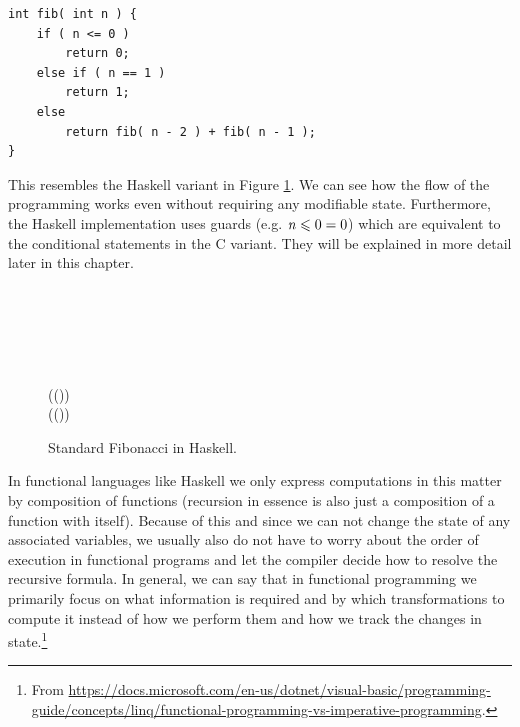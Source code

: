 \documentclass[paper=A4,twoside=true,openright,parskip=full,chapterprefix=true,headings=normal,bibliography=totoc,listof=totoc,titlepage=on,captions=tableabove,draft=false,british]{scrreprt}%
\begin{document}
\begin{center}
\lstset{language=C}
\centering
\begin{lstlisting}
int fib( int n ) {
    if ( n <= 0 )
        return 0;
    else if ( n == 1 )
        return 1;
    else
        return fib( n - 2 ) + fib( n - 1 );
}
\end{lstlisting}
\end{center}
\vspace{-1\baselineskip}

This resembles the Haskell variant in Figure \ref{fig:fibonacciHaskell}.
We can see how the flow of the programming works even without requiring
any modifiable state. Furthermore, the Haskell implementation uses
guards (e.g. \ensuremath{\Varid{n}\leq \mathrm{0}\mathrel{=}\mathrm{0}}) which are equivalent to the conditional
statements in the C variant. They will be explained in more detail later
in this chapter.

\begin{figure}[h]
\centering
\begin{hscode}\SaveRestoreHook
{}%
%
%
%
%
\>[B]{}\mathbin{::}\to {}\<[E]%
\\
\>[B]{}\;\<[E]%
\\
\>[B]{}\<[5]%
\>[5]{}\mid {}\leq {}\mathrel{=}\<[E]%
\\
\>[B]{}\<[5]%
\>[5]{}\mid {}\equiv {}\mathrel{=}\<[E]%
\\
\>[B]{}\<[5]%
\>[5]{}\mid {}\mathrel{=}{}\<[E]%
\\
\>[5]{}\<[9]%
\>[9]{}(\;(\mathbin{-})){}\<[E]%
\\
\>[9]{}\<[13]%
\>[13]{}\mathbin{+}(\;(\mathbin{-})){}\<[E]%
\ColumnHook
\end{hscode}\resethooks
\caption{Standard Fibonacci in Haskell.}\label{fig:fibonacciHaskell}\end{figure}

In functional languages like Haskell we only express computations in
this matter by composition of functions (recursion in essence is also
just a composition of a function with itself). Because of this and since
we can not change the state of any associated variables, we usually also
do not have to worry about the order of execution in functional programs
and let the compiler decide how to resolve the recursive formula. In
general, we can say that in functional programming we primarily focus on
what information is required and by which transformations to compute it
instead of how we perform them and how we track the changes in
state.\footnote{From
  \url{https://docs.microsoft.com/en-us/dotnet/visual-basic/programming-guide/concepts/linq/functional-programming-vs-imperative-programming}.}
\end{document}
